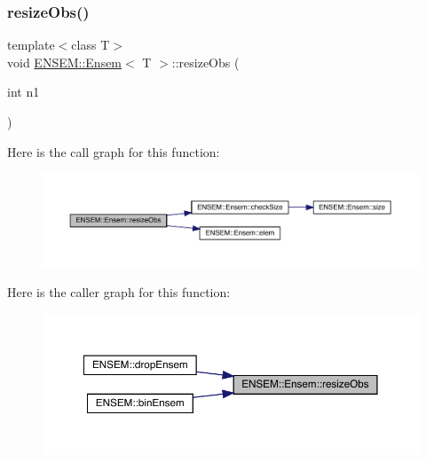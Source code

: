 \subsubsection{\texorpdfstring{resizeObs()}{resizeObs()}\hspace{0.1cm}{\footnotesize\ttfamily [2/8]}}
{\footnotesize\ttfamily template$<$class T$>$ \\
void \mbox{\hyperlink{classENSEM_1_1Ensem}{E\+N\+S\+E\+M\+::\+Ensem}}$<$ T $>$\+::resize\+Obs (\begin{DoxyParamCaption}\item[{int}]{n1 }\end{DoxyParamCaption})\hspace{0.3cm}{\ttfamily [inline]}}

Here is the call graph for this function\+:
\nopagebreak
\begin{figure}[H]
\begin{center}
\leavevmode
\includegraphics[width=350pt]{d7/d3e/classENSEM_1_1Ensem_a20ee27dffc4b1db635103ce40fb0d5c2_cgraph}
\end{center}
\end{figure}
Here is the caller graph for this function\+:\nopagebreak
\begin{figure}[H]
\begin{center}
\leavevmode
\includegraphics[width=350pt]{d7/d3e/classENSEM_1_1Ensem_a20ee27dffc4b1db635103ce40fb0d5c2_icgraph}
\end{center}
\end{figure}
\mbox{\label{classENSEM_1_1Ensem_af74074307267e421a53a3e9e9e2449fc}} 
